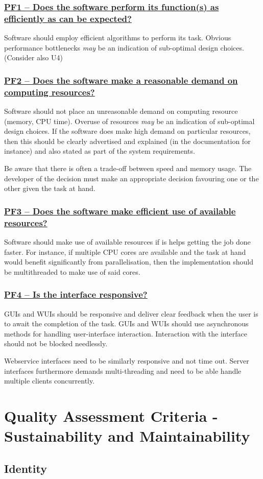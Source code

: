 \documentclass[a4paper,11pt]{article}
\newcommand{\indicator}[1]{\subsubsection*{\underline{#1}}}
\begin{document}
\indicator{PF1 -- Does the software perform its function(s) as efficiently as can be expected?}

Software should employ efficient algorithms to perform its task. Obvious performance bottlenecks \emph{may} be an indication of sub-optimal design choices.
(Consider also U4)

\indicator{PF2 -- Does the software make a reasonable demand on computing resources?}

Software should not place an unreasonable demand on computing resource (memory,
CPU time). Overuse of resources \emph{may} be an indication of sub-optimal
design choices.  If the software does make high demand on particular resources,
then this should be clearly advertised and explained (in the documentation for
instance) and also stated as part of the system requirements.

Be aware that there is often a trade-off between speed and memory usage. The
developer of the decision must make an appropriate decision favouring one or the other
given the task at hand. 

\indicator{PF3 -- Does the software make efficient use of available resources?}

Software should make use of available resources if is helps getting the job
done faster. For instance, if multiple CPU cores are available and the task at hand
would benefit significantly from parallelisation, then the implementation should be
multithreaded to make use of said cores.

\indicator{PF4 -- Is the interface responsive?}

GUIs and WUIs should be responsive and deliver clear feedback when the user is
to await the completion of the task. GUIs and WUIs should use asynchronous methods for
handling user-interface interaction. Interaction with the interface should not
be blocked needlessly.

Webservice interfaces need to be similarly responsive and not time out. Server
interfaces furthermore demands multi-threading and need to be able handle
multiple clients concurrently.


\section{Quality Assessment Criteria - Sustainability and Maintainability}

\subsection{Identity}
\end{document}
